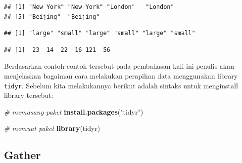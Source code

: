 \documentclass[]{book}
\newenvironment{Shaded}{\begin{snugshade}}{\end{snugshade}}
\newcommand{\KeywordTok}[1]{\textcolor[rgb]{0.13,0.29,0.53}{\textbf{#1}}}
\newcommand{\StringTok}[1]{\textcolor[rgb]{0.31,0.60,0.02}{#1}}
\newcommand{\CommentTok}[1]{\textcolor[rgb]{0.56,0.35,0.01}{\textit{#1}}}
\newcommand{\OperatorTok}[1]{\textcolor[rgb]{0.81,0.36,0.00}{\textbf{#1}}}
\newcommand{\NormalTok}[1]{#1}
\begin{document}
\begin{Shaded}
\end{Shaded}

\begin{verbatim}
## [1] "New York" "New York" "London"   "London"  
## [5] "Beijing"  "Beijing"
\end{verbatim}

\begin{Shaded}
\end{Shaded}

\begin{verbatim}
## [1] "large" "small" "large" "small" "large" "small"
\end{verbatim}

\begin{Shaded}
\end{Shaded}

\begin{verbatim}
## [1]  23  14  22  16 121  56
\end{verbatim}

Berdasarkan contoh-contoh tersebut pada pembahasan kali ini penulis akan
menjelaskan bagaiman cara melakukan perapihan data menggunakan library
\texttt{tidyr}. Sebelum kita melakukannya berikut adalah sintaks untuk
menginstall library tersebut:

\begin{Shaded}
\begin{Highlighting}[]
\CommentTok{# memasang paket}
\KeywordTok{install.packages}\NormalTok{(}\StringTok{"tidyr"}\NormalTok{)}
\end{Highlighting}
\end{Shaded}

\begin{Shaded}
\begin{Highlighting}[]
\CommentTok{# memuat paket}
\KeywordTok{library}\NormalTok{(tidyr)}
\end{Highlighting}
\end{Shaded}

\subsection{Gather}\label{gather}
\end{document}
